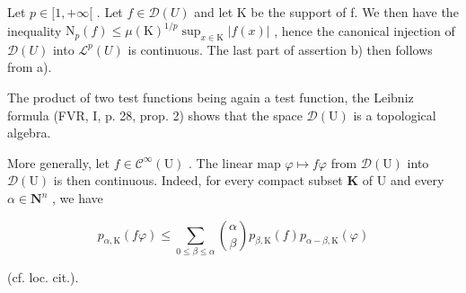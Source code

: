 Let \(p \in [1, +\infty[\) . Let \(f \in \mathcal{D}(U)\) and let K be the support of f. We then have the inequality \(\mathrm{N}_{p}(f) \leqslant \mu(\mathrm{K})^{1/p} \sup_{x \in \mathrm{K}} |f(x)|\) , hence the canonical injection of \(\mathcal{D}(U)\) into \(\mathcal{L}^{p}(U)\) is continuous. The last part of assertion b) then follows from a).

The product of two test functions being again a test function, the Leibniz formula (FVR, I, p. 28, prop. 2) shows that the space \(\mathcal{D}(\mathrm{U})\) is a topological algebra.

More generally, let \(f \in \mathcal{C}^{\infty}(\mathrm{U})\) . The linear map \(\varphi \mapsto f\varphi\) from \(\mathcal{D}(\mathrm{U})\) into \(\mathcal{D}(\mathrm{U})\) is then continuous. Indeed, for every compact subset \(\mathbf{K}\) of \(\mathrm{U}\) and every \(\alpha \in \mathbf{N}^{n}\) , we have

\[
p _ {\alpha , \mathrm{K}} (f \varphi) \leqslant \sum_ {0 \leqslant \beta \leqslant \alpha} \binom {\alpha} {\beta} p _ {\beta , \mathrm{K}} (f) p _ {\alpha - \beta , \mathrm{K}} (\varphi)
\]

(cf. loc. cit.).

